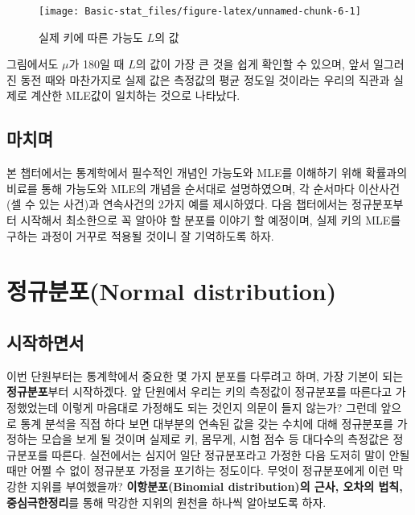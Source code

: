 \documentclass[]{book}
\begin{document}
\begin{figure}

{\centering \texttt{[image: Basic-stat\_files/figure-latex/unnamed-chunk-6-1]} 

}

\caption{실제 키에 따른 가능도 $L$의 값}\label{fig:unnamed-chunk-6}
\end{figure}

그림에서도 \(\mu\)가 180일 때 \(L\)의 값이 가장 큰 것을 쉽게 확인할 수 있으며, 앞서 일그러진 동전 때와 마찬가지로 실제 값은 측정값의 평균 정도일 것이라는 우리의 직관과 실제로 계산한 MLE값이 일치하는 것으로 나타났다.

\hypertarget{uxb9c8uxce58uxba70}{%
\section{마치며}\label{uxb9c8uxce58uxba70}}

본 챕터에서는 통계학에서 필수적인 개념인 가능도와 MLE를 이해하기 위해 확률과의 비료를 통해 가능도와 MLE의 개념을 순서대로 설명하였으며, 각 순서마다 이산사건(셀 수 있는 사건)과 연속사건의 2가지 예를 제시하였다. 다음 챕터에서는 정규분포부터 시작해서 최소한으로 꼭 알아야 할 분포를 이야기 할 예정이며, 실제 키의 MLE를 구하는 과정이 거꾸로 적용될 것이니 잘 기억하도록 하자.

\hypertarget{uxc815uxaddcuxbd84uxd3ecnormal-distribution}{%
\chapter{정규분포(Normal distribution)}\label{uxc815uxaddcuxbd84uxd3ecnormal-distribution}}

\hypertarget{uxc2dcuxc791uxd558uxba74uxc11c-1}{%
\section{시작하면서}\label{uxc2dcuxc791uxd558uxba74uxc11c-1}}

이번 단원부터는 통계학에서 중요한 몇 가지 분포를 다루려고 하며, 가장 기본이 되는 \textbf{정규분포}부터 시작하겠다. 앞 단원에서 우리는 키의 측정값이 정규분포를 따른다고 가정했었는데 이렇게 마음대로 가정해도 되는 것인지 의문이 들지 않는가? 그런데 앞으로 통계 분석을 직접 하다 보면 대부분의 연속된 값을 갖는 수치에 대해 정규분포를 가정하는 모습을 보게 될 것이며 실제로 키, 몸무게, 시험 점수 등 대다수의 측정값은 정규분포를 따른다. 실전에서는 심지어 일단 정규분포라고 가정한 다음 도저히 말이 안될 때만 어쩔 수 없이 정규분포 가정을 포기하는 정도이다. 무엇이 정규분포에게 이런 막강한 지위를 부여했을까? \textbf{이항분포(Binomial distribution)의 근사, 오차의 법칙, 중심극한정리}를 통해 막강한 지위의 원천을 하나씩 알아보도록 하자.
\end{document}
